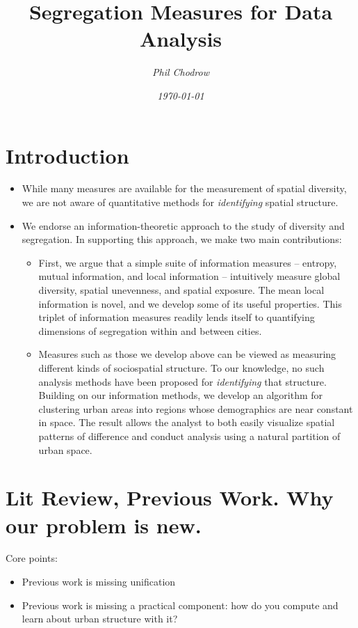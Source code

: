 \documentclass[english]{scrartcl}
\title{Segregation Measures for Data Analysis} %
\author{\emph{Phil Chodrow}}
\date{\emph{\today}}
\begin{document}

\maketitle

\abstract{}

\section{Introduction} \label{sec:intro}
	\begin{itemize}
		\item While many measures are available for the measurement of spatial diversity, we are not aware of quantitative methods for \emph{identifying} spatial structure. 
		\item We endorse an information-theoretic approach to the study of diversity and segregation. In supporting this approach, we make two main contributions: 
		\begin{itemize}
			\item First, we argue that a simple suite of information measures -- entropy, mutual information, and local information -- intuitively measure global diversity, spatial unevenness, and spatial exposure. The mean local information is novel, and we develop some of its useful properties. This triplet of information measures readily lends itself to quantifying dimensions of segregation within and between cities. 
			\item Measures such as those we develop above can be viewed as measuring different kinds of sociospatial structure. To our knowledge, no such analysis methods have been proposed for \emph{identifying} that structure. Building on our information methods, we develop an algorithm for clustering urban areas into regions whose demographics are near constant in space. The result allows the analyst to both easily visualize spatial patterns of difference and conduct analysis using a natural partition of urban space. 
		\end{itemize}
	\end{itemize}
\section{Lit Review, Previous Work. Why our problem is new.} \label{sec:previous}
	Core points: 
	\begin{itemize}
		\item Previous work is missing unification
		\item Previous work is missing a practical component: how do you compute and learn about urban structure with it? 
	\end{itemize}
\end{document}
